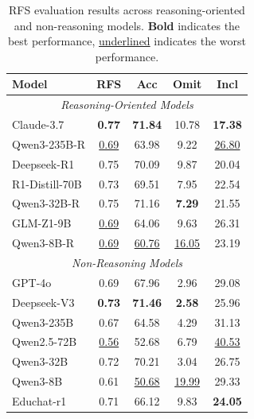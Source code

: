 \documentclass[letterpaper]{article} %
\begin{document}
\begin{table}[ht!]
\centering
{
\small %
\setlength{\tabcolsep}{3pt} %
\begin{tabular}{lcccc}
\toprule
\textbf{Model} & \textbf{RFS} & \textbf{Acc} & \textbf{Omit} & \textbf{Incl} \\
\midrule
\multicolumn{5}{c}{\textit{Reasoning-Oriented Models}} \\
\midrule
Claude-3.7 & \textbf{0.77} & \textbf{71.84} & 10.78 & \textbf{17.38} \\
Qwen3-235B-R & \underline{0.69} & 63.98 & 9.22 & \underline{26.80} \\
Deepseek-R1 & 0.75 & 70.09 & 9.87 & 20.04 \\
R1-Distill-70B & 0.73 & 69.51 & 7.95 & 22.54 \\
Qwen3-32B-R & 0.75 & 71.16 & \textbf{7.29} & 21.55 \\
GLM-Z1-9B & \underline{0.69} & 64.06 & 9.63 & 26.31 \\
Qwen3-8B-R & \underline{0.69} & \underline{60.76} & \underline{16.05} & 23.19 \\
\midrule
\multicolumn{5}{c}{\textit{Non-Reasoning Models}} \\
\midrule
GPT-4o & 0.69 & 67.96 & 2.96 & 29.08 \\
Deepseek-V3 & \textbf{0.73} & \textbf{71.46} & \textbf{2.58} & 25.96 \\
Qwen3-235B & 0.67 & 64.58 & 4.29 & 31.13 \\
Qwen2.5-72B & \underline{0.56} & 52.68 & 6.79 & \underline{40.53} \\
Qwen3-32B & 0.72 & 70.21 & 3.04 & 26.75 \\
Qwen3-8B & 0.61 & \underline{50.68} & \underline{19.99} & 29.33 \\
Educhat-r1 & 0.71 & 66.12 & 9.83 & \textbf{24.05} \\
\bottomrule
\end{tabular}
} %
\caption{RFS evaluation results across reasoning-oriented and non-reasoning models. \textbf{Bold} indicates the best performance, \underline{underlined} indicates the worst performance.}
\label{tab:teaching_capability}
\end{table}
\end{document}
